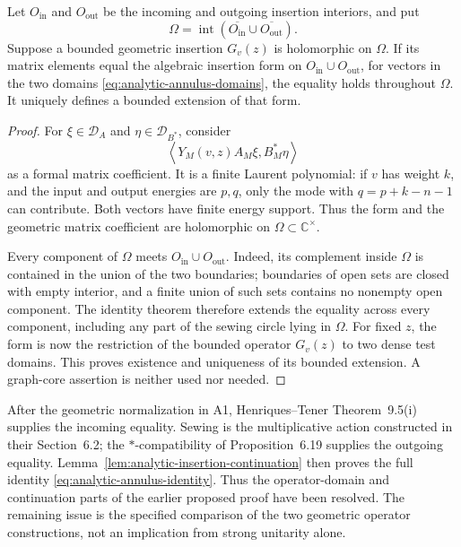 \begin{lemma}
\label{lem:analytic-insertion-continuation}
Let $O_{\mathrm{in}}$ and $O_{\mathrm{out}}$ be the incoming and
outgoing insertion interiors, and put
\[
 \Omega=\operatorname{int}
  (\overline{O_{\mathrm{in}}}\cup\overline{O_{\mathrm{out}}}).
\]
Suppose a bounded geometric insertion $G_v(z)$ is holomorphic on
$\Omega$.  If its matrix elements equal the algebraic insertion form
on $O_{\mathrm{in}}\cup O_{\mathrm{out}}$, for vectors in the two
domains \eqref{eq:analytic-annulus-domains}, the equality holds
throughout $\Omega$.  It uniquely defines a bounded extension of that
form.
\end{lemma}
\begin{proof}
For $\xi\in\mathcal D_A$ and $\eta\in\mathcal D_{B^*}$, consider
\begin{equation}
 \left\langle Y_M(v,z)A_M\xi,B_M^*\eta\right\rangle
 \label{eq:analytic-laurent-pairing}
\end{equation}
as a formal matrix coefficient.  It is a finite Laurent polynomial:
if $v$ has weight $k$, and the input and output energies are $p,q$,
only the mode with $q=p+k-n-1$ can contribute.  Both vectors have
finite energy support.  Thus the form and the geometric matrix
coefficient are holomorphic on $\Omega\subset\mathbb C^\times$.

Every component of $\Omega$ meets
$O_{\mathrm{in}}\cup O_{\mathrm{out}}$.  Indeed, its complement
inside $\Omega$ is contained in the union of the two boundaries;
boundaries of open sets are closed with empty interior, and a finite
union of such sets contains no nonempty open component.  The identity
theorem therefore extends the equality across every component,
including any part of the sewing circle lying in $\Omega$.
For fixed $z$, the form is now the restriction of the bounded operator
$G_v(z)$ to two dense test domains.  This proves existence and
uniqueness of its bounded extension.  A graph-core assertion is neither
used nor needed.
\end{proof}

After the geometric normalization in A1, Henriques--Tener
Theorem~9.5(i) supplies the incoming equality.  Sewing is the
multiplicative action constructed in their Section~6.2; the
$*$-compatibility of Proposition~6.19 supplies the outgoing equality.
Lemma~\ref{lem:analytic-insertion-continuation} then proves the full
identity \eqref{eq:analytic-annulus-identity}.  Thus the operator-domain
and continuation parts of the earlier proposed proof have been
resolved.  The remaining issue is the specified comparison of the
two geometric operator constructions, not an implication from strong
unitarity alone.

